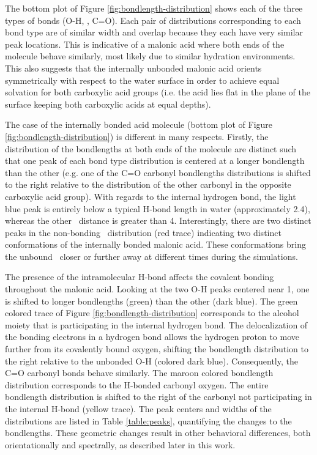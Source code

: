 The bottom plot of Figure \ref{fig:bondlength-distribution} shows each of the three types of bonds (O-H, \ocarbh, C=O). Each pair of distributions corresponding to each bond type are of similar width and overlap because they each have very similar peak locations. This is indicative of a malonic acid where both ends of the molecule behave similarly, most likely due to similar hydration environments. This also suggests that the internally unbonded malonic acid orients symmetrically with respect to the water surface in order to achieve equal solvation for both carboxylic acid groups (i.e. the acid lies flat in the plane of the surface keeping both carboxylic acids at equal depths). 

The case of the internally bonded acid molecule (bottom plot of Figure \ref{fig:bondlength-distribution}) is different in many respects. Firstly, the distribution of the bondlengths at both ends of the molecule are distinct such that one peak of each bond type distribution is centered at a longer bondlength than the other (e.g. one of the C=O carbonyl bondlengths distributions is shifted to the right relative to the distribution of the other carbonyl in the opposite carboxylic acid group). With regards to the internal hydrogen bond, the light blue peak is entirely below a typical H-bond length in water (approximately 2.4\angs), whereas the other \ocarbh~distance is greater than 4\angs. Interestingly, there are two distinct peaks in the non-bonding \ocarbh~distribution (red trace) indicating two distinct conformations of the internally bonded malonic acid. These conformations bring the unbound \ocarbh~closer or further away at different times during the simulations.

The presence of the intramolecular H-bond affects the covalent bonding throughout the malonic acid. Looking at the two O-H peaks centered near 1\angs, one is shifted to longer bondlengths (green) than the other (dark blue). The green colored trace of Figure \ref{fig:bondlength-distribution} corresponds to the alcohol moiety that is participating in the internal hydrogen bond. The delocalization of the bonding electrons in a hydrogen bond allows the hydrogen proton to move further from its covalently bound oxygen, shifting the bondlength distribution to the right relative to the unbonded O-H (colored dark blue). Consequently, the C=O carbonyl bonds behave similarly. The maroon colored bondlength distribution corresponds to the H-bonded carbonyl oxygen. The entire bondlength distribution is shifted to the right of the carbonyl not participating in the internal H-bond (yellow trace). The peak centers and widths of the distributions are listed in Table \ref{table:peaks}, quantifying the changes to the bondlengths. These geometric changes result in other behavioral differences, both orientationally and spectrally, as described later in this work.

